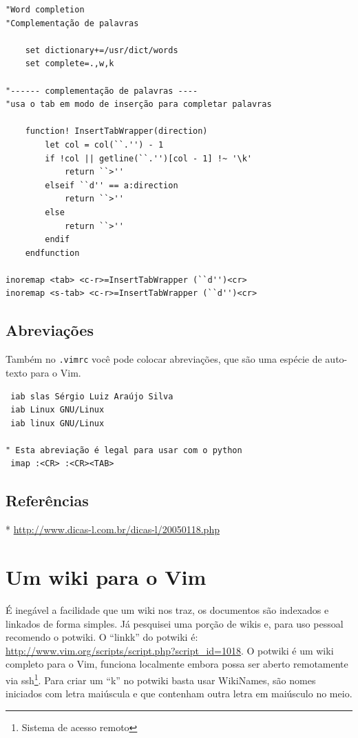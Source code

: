 \documentclass[10pt,a4paper,openany]{book}
\begin{document}
\begin{verbatim}
"Word completion
"Complementação de palavras

	set dictionary+=/usr/dict/words
	set complete=.,w,k

"------ complementação de palavras ----
"usa o tab em modo de inserção para completar palavras

	function! InsertTabWrapper(direction)
		let col = col(``.'') - 1
		if !col || getline(``.'')[col - 1] !~ '\k'
			return ``>''
		elseif ``d'' == a:direction
			return ``>''
		else
			return ``>''
		endif
	endfunction

inoremap <tab> <c-r>=InsertTabWrapper (``d'')<cr>
inoremap <s-tab> <c-r>=InsertTabWrapper (``d'')<cr>
\end{verbatim}

\section{Abreviações}\label{Abreviações}
Também no \verb|.vimrc| você pode colocar abreviações, que são uma espécie de
auto-texto para o Vim.

\begin{verbatim}
 iab slas Sérgio Luiz Araújo Silva
 iab Linux GNU/Linux
 iab linux GNU/Linux

" Esta abreviação é legal para usar com o python
 imap :<CR> :<CR><TAB>
\end{verbatim}

\section{Referências}
\label{Referências}
* \url{http://www.dicas-l.com.br/dicas-l/20050118.php}

\chapter{Um wiki para o Vim}\label{cha:Um wiki para o Vim}

É inegável a facilidade que um wiki nos traz, os documentos são
indexados e linkados de forma simples. Já pesquisei uma porção de
wikis e, para uso pessoal recomendo o potwiki.  O ``linkk'' do potwiki é:
\url{http://www.vim.org/scripts/script.php?script_id=1018}.
O potwiki é um wiki completo para o Vim, funciona localmente embora
possa ser aberto remotamente via ssh\footnote{Sistema de acesso remoto}.
Para criar um ``k'' no potwiki basta usar WikiNames, são nomes
iniciados com letra maiúscula e que contenham outra letra em maiúsculo
no meio. \\
\end{document}
